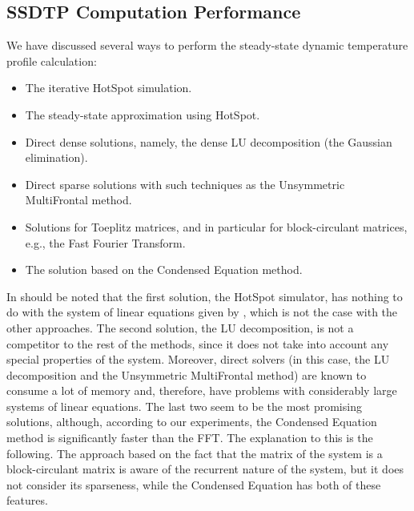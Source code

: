 \subsection{SSDTP Computation Performance} \label{sec:results-ssdtp}
We have discussed several ways to perform the steady-state dynamic temperature profile calculation:
\begin{itemize}
  \item The iterative HotSpot simulation.
  \item The steady-state approximation using HotSpot.
  \item Direct dense solutions, namely, the dense LU decomposition (the Gaussian elimination).
  \item Direct sparse solutions with such techniques as the Unsymmetric MultiFrontal method.
  \item Solutions for Toeplitz matrices, and in particular for block-circulant matrices, e.g., the Fast Fourier Transform.
  \item The solution based on the Condensed Equation method.
\end{itemize}

In should be noted that the first solution, the HotSpot simulator, has nothing to do with the system of linear equations given by , which is not the case with the other approaches. The second solution, the LU decomposition, is not a competitor to the rest of the methods, since it does not take into account any special properties of the system. Moreover, direct solvers (in this case, the LU decomposition and the Unsymmetric MultiFrontal method) are known to consume a lot of memory and, therefore, have problems with considerably large systems of linear equations. The last two seem to be the most promising solutions, although, according to our experiments, the Condensed Equation method is significantly faster than the FFT. The explanation to this is the following. The approach based on the fact that the matrix of the system is a block-circulant matrix is aware of the recurrent nature of the system, but it does not consider its sparseness, while the Condensed Equation has both of these features.


